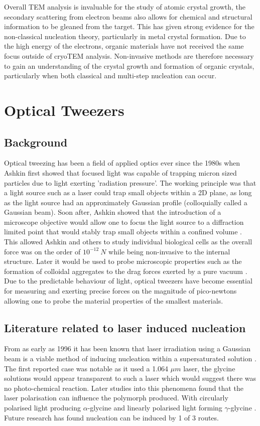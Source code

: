 Overall TEM analysis is invaluable for the study of atomic 
crystal growth, the secondary scattering from electron 
beams also allows for chemical and structural information 
to be gleaned from the target. This has given strong evidence
for the non-classical nucleation theory, particularly in 
metal crystal formation. Due to the high energy of the 
electrons, organic materials have not received the same
focus outside of cryoTEM analysis. Non-invasive methods
are therefore necessary to gain an understanding of the
crystal growth and formation of organic crystals, 
particularly when both classical and multi-step nucleation 
can occur.


\section{Optical Tweezers}
\subsection{Background}
Optical tweezing has been a field of applied optics ever since 
the 1980s when Ashkin \cite{Ashkin1970} first showed that focused 
light was capable of trapping micron sized particles due to light 
exerting 'radiation pressure'. The working principle was that a 
light source such as a laser could trap small objects within a 2D 
plane, as long as the light source had an approximately Gaussian 
profile (colloquially called a Gaussian beam). Soon after, Ashkin 
showed that the introduction of a microscope objective would allow 
one to focus the light source to a diffraction limited point that 
would stably trap small objects within a confined volume 
\cite{Ashkin1980}. This allowed Ashkin and others to study individual 
biological cells as the overall force was on the order of $10^{-12}\ 
N$ while being non-invasive to the internal structure. Later it would 
be used to probe microscopic properties such as the formation of 
colloidal aggregates \cite{Yi2021} to the drag forces exerted by a 
pure vacuum \cite{Ahn2018, Monteiro2018}. Due to the predictable 
behaviour of light, optical tweezers have become essential for 
measuring and exerting precise forces on the magnitude of pico-newtons 
allowing one to probe the material properties of the smallest 
materials. 

\subsection{Literature related to laser induced nucleation}
From as early as 1996 it has been known that laser irradiation 
using a Gaussian beam is a viable method of inducing nucleation 
within a supersaturated solution \cite{Garetz1996}. The first 
reported case was notable as it used a 1.064 $\mu m$ laser, the 
glycine solutions would appear transparent to such a laser which 
would suggest there was no photo-chemical reaction. Later studies 
into this phenomena found that the laser polarisation can influence 
the polymorph produced. With circularly polarised light producing 
$\alpha$-glycine and linearly polarised light forming $\gamma$-glycine 
\cite{Garetz2002}. Future research has found nucleation can be 
induced by 1 of 3 routes.

